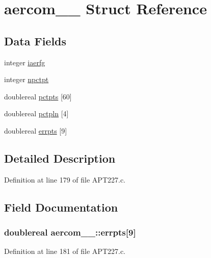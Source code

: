 \hypertarget{structaercom__1__}{}\section{aercom\+\_\+\_\+ Struct Reference}
\label{structaercom__1__}
\subsection*{Data Fields}
\begin{DoxyCompactItemize}
\item 
integer \hyperlink{structaercom__1___a656ade274706684e2d03123560edd226}{iaerfg}
\item 
integer \hyperlink{structaercom__1___a662b5dbe10213b1bf10c7e03fdb26c11}{npctpt}
\item 
doublereal \hyperlink{structaercom__1___a3d6582c8aaff0857d2b22dece351b2ef}{pctpts} \mbox{[}60\mbox{]}
\item 
doublereal \hyperlink{structaercom__1___a156ca4cdb2e16cfa40ee9634caf890d2}{pctpln} \mbox{[}4\mbox{]}
\item 
doublereal \hyperlink{structaercom__1___a52ca8de35e2d00d5ca566949d373b71b}{errpts} \mbox{[}9\mbox{]}
\end{DoxyCompactItemize}


\subsection{Detailed Description}


Definition at line 179 of file A\+P\+T227.\+c.



\subsection{Field Documentation}
\subsubsection[{\texorpdfstring{errpts}{errpts}}]{\setlength{\rightskip}{0pt plus 5cm}doublereal aercom\+\_\+\_\+\+::errpts\mbox{[}9\mbox{]}}\hypertarget{structaercom__1___a52ca8de35e2d00d5ca566949d373b71b}{}\label{structaercom__1___a52ca8de35e2d00d5ca566949d373b71b}


Definition at line 181 of file A\+P\+T227.\+c.

